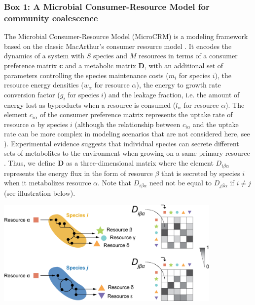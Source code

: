 \documentclass[a4paper,10pt]{article}
\newcommand{\methodsref}[1]{%
  \hyperref[{methods:#1}]{%
   Methods:~\nameref*{methods:#1}%
  }%
}
\begin{document}
\begin{mdframed}
\internallinenumbers
\subsubsection*{Box 1: A Microbial Consumer-Resource Model for community coalescence}
\label{box1}

The Microbial Consumer-Resource Model (MicroCRM) \cite{Goldford2018,Marsland2019,Marsland2020}
is a modeling framework based on the classic MacArthur's consumer resource model
\cite{MacArthur1970}.
It encodes the dynamics of a system with $S$ species and $M$ resources
in terms of a consumer preference matrix $\mathbf{c}$ and a metabolic matrix $\mathbf{D}$,
with an additional set of parameters controlling
the species maintenance costs ($m_i$ for species $i$),
the resource energy densities ($w_\alpha$ for resource $\alpha$),
the energy to growth rate conversion factor ($g_i$ for species $i$)
and the leakage fraction, i.e. the amount of energy lost as byproducts when a resource is consumed
($l_\alpha$ for resource $\alpha$).
The element $c_{i\alpha}$ of the consumer preference matrix
represents the uptake rate of resource $\alpha$ by
species $i$ (although the relationship between $c_{i\alpha}$ and the uptake rate can be more
complex in modeling scenarios that are not considered here,
see \cite{Goldford2018,Marsland2019,Marsland2020}).
Experimental evidence suggests that individual species can secrete different sets of metabolites
to the environment when growing on a same primary resource
\cite{Harcombe2014,Pinu2018,Estrela2020}.
Thus, we define $\mathbf{D}$ as a three-dimensional matrix
where the element $D_{i\beta\alpha}$ represents the energy flux in the form of resource $\beta$
that is secreted by species $i$ when it metabolizes resource $\alpha$.
Note that $D_{i\beta\alpha}$ need not be equal to $D_{j\beta\alpha}$ if $i \neq j$
(see illustration below).

\bigskip
\begin{center}
\includegraphics[width=11cm,keepaspectratio]{figs/figBox_v3.png}
\end{center}
\bigskip


\end{mdframed}
\end{document}
